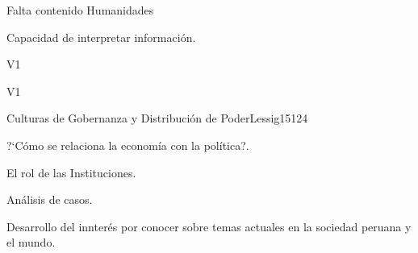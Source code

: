 \begin{syllabus}


\begin{justification}
Falta contenido Humanidades
\end{justification}

\begin{goals}
\item Capacidad de interpretar información.
\end{goals}

\begin{outcomes}{V1}
    \item {}
    \item {}
    \item {}
    
\end{outcomes}

\begin{competences}{V1}
    \item {}
    \item {}
    \item {}
    \item {}
\end{competences}

\begin{unit}{Culturas de Gobernanza y Distribución de Poder}{}{Lessig15}{12}{4}
   \begin{topics}
      \item ?`Cómo se relaciona la economía con la política?.
      \item El rol de las Instituciones.
      \item Análisis de casos.
   \end{topics}
   \begin{learningoutcomes}
      \item Desarrollo del innterés por conocer sobre temas actuales en la sociedad peruana y el mundo.
   \end{learningoutcomes}
\end{unit}

\begin{coursebibliography}
\end{coursebibliography}

\end{syllabus}

